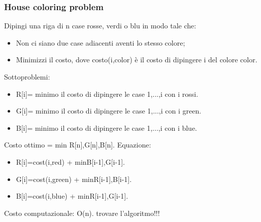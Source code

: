 \documentclass{article}
\begin{document}
\subsubsection{House coloring problem}
Dipingi una riga di n case rosse, verdi o blu in modo tale che:
\begin{itemize}
    \item Non ci siano due case adiacenti aventi lo stesso colore;
    \item Minimizzi il costo, dove costo(i,color) è il costo di dipingere i del colore color.
\end{itemize}
Sottoproblemi:
\begin{itemize}
    \item R[i]= minimo il costo di dipingere le case 1,...,i con i rossi.
    \item G[i]= minimo il costo di dipingere le case 1,...,i con i green.
    \item B[i]= minimo il costo di dipingere le case 1,...,i con i blue.
\end{itemize}
Costo ottimo = min {R[n],G[n],B[n]}.\newline
Equazione:
\begin{itemize}
    \item R[i]=cost(i,red) + min{B[i-1],G[i-1]}.
    \item G[i]=cost(i,green) + min{R[i-1],B[i-1]}.
    \item B[i]=cost(i,blue) + min{R[i-1],G[i-1]}.
\end{itemize}
Costo computazionale: O(n).
trovare l'algoritmo!!!
\end{document}
